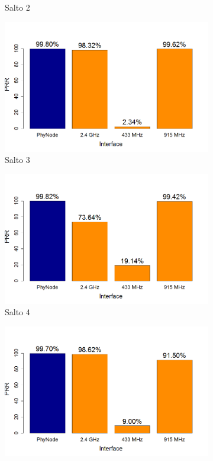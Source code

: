 \documentclass[
	12pt,				%
	openright,			%
	oneside,
	a4paper,			%
	english,			%
	french,				%
	spanish,			%
	brazil				%
	]{abntex2}
\begin{document}
\begin{figure}[tb]
\begin{subfigure}{.5\textwidth}
		\captionsetup{width=.9\textwidth}
		\caption{Salto 2}
		\label{prr_no_opt_s2}
	\end{subfigure}
	\begin{subfigure}{.5\textwidth}
		\centering
		\includegraphics[width=.98\linewidth]{PRR_Salto3}
		\captionsetup{width=.9\textwidth}
		\caption{Salto 3}
		\label{prr_no_opt_s3}
	\end{subfigure}%
	\begin{subfigure}{.5\textwidth}
		\centering
		\includegraphics[width=.98\linewidth]{PRR_Salto4}
		\captionsetup{width=.9\textwidth}
		\caption{Salto 4}
		\label{prr_no_opt_s4}
	\end{subfigure}
	\begin{subfigure}{.5\textwidth}
		\centering
		\includegraphics[width=.98\linewidth]{PRR_Salto5}

\end{subfigure}
\end{figure}
\end{document}
